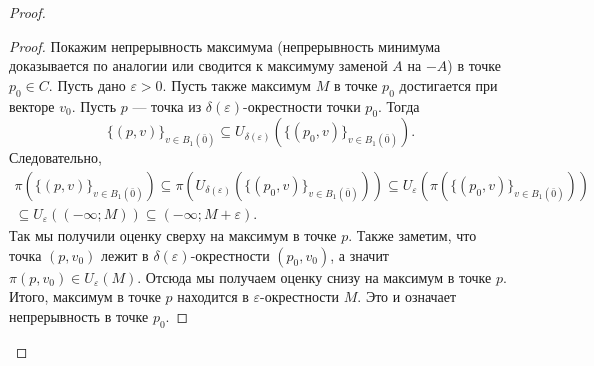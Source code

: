 \documentclass[12pt,a4paper]{article}
\begin{document}
\begin{proof}
\begin{proof}
            Покажим непрерывность максимума (непрерывность минимума доказывается по аналогии или сводится к максимуму заменой $A$ на $-A$) в точке $p_0 \in C$. Пусть дано $\varepsilon > 0$. Пусть также максимум $M$ в точке $p_0$ достигается при векторе $v_0$. Пусть $p$ --- точка из $\delta(\varepsilon)$-окрестности точки $p_0$. Тогда
            \[\{(p, v)\}_{v \in B_1(\bar{0})} \subseteq U_{\delta(\varepsilon)}(\{(p_0, v)\}_{v \in B_1(\bar{0})}).\]
            Следовательно,
            \begin{multline*}
                \pi(\{(p, v)\}_{v \in B_1(\bar{0})})
                \subseteq \pi(U_{\delta(\varepsilon)}(\{(p_0, v)\}_{v \in B_1(\bar{0})}))
                \subseteq U_{\varepsilon}(\pi(\{(p_0, v)\}_{v \in B_1(\bar{0})}))\\
                \subseteq U_{\varepsilon}((-\infty; M))
                \subseteq (-\infty; M+\varepsilon).
            \end{multline*}
            Так мы получили оценку сверху на максимум в точке $p$. Также заметим, что точка $(p, v_0)$ лежит в $\delta(\varepsilon)$-окрестности $(p_0, v_0)$, а значит $\pi(p, v_0) \in U_\varepsilon(M)$. Отсюда мы получаем оценку снизу на максимум в точке $p$. Итого, максимум в точке $p$ находится в $\varepsilon$-окрестности $M$. Это и означает непрерывность в точке $p_0$.
        \end{proof}


\end{proof}
\end{document}
